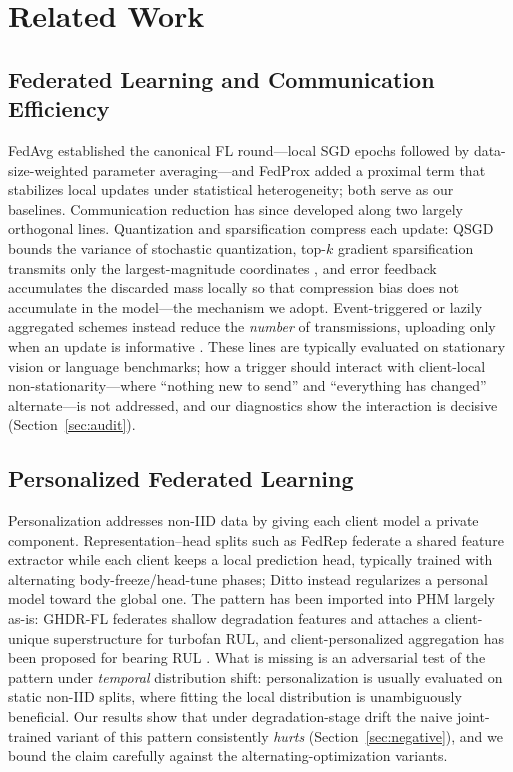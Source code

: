 \documentclass[journal]{IEEEtran}
\begin{document}
\section{Related Work}\label{sec:related}

\subsection{Federated Learning and Communication Efficiency}
FedAvg \cite{mcmahan2017} established the canonical FL round---local SGD epochs followed by data-size-weighted parameter averaging---and FedProx \cite{li2020fedprox} added a proximal term that stabilizes local updates under statistical heterogeneity; both serve as our baselines. Communication reduction has since developed along two largely orthogonal lines. Quantization and sparsification compress each update: QSGD \cite{alistarh2017} bounds the variance of stochastic quantization, top-$k$ gradient sparsification transmits only the largest-magnitude coordinates \cite{aji2017}, and error feedback \cite{karimireddy2019} accumulates the discarded mass locally so that compression bias does not accumulate in the model---the mechanism we adopt. Event-triggered or lazily aggregated schemes instead reduce the \emph{number} of transmissions, uploading only when an update is informative \cite{chen2018lag}. These lines are typically evaluated on stationary vision or language benchmarks; how a trigger should interact with client-local non-stationarity---where ``nothing new to send'' and ``everything has changed'' alternate---is not addressed, and our diagnostics show the interaction is decisive (Section~\ref{sec:audit}).
\subsection{Personalized Federated Learning}
Personalization addresses non-IID data by giving each client model a private component. Representation--head splits such as FedRep \cite{collins2021fedrep} federate a shared feature extractor while each client keeps a local prediction head, typically trained with alternating body-freeze/head-tune phases; Ditto \cite{li2021ditto} instead regularizes a personal model toward the global one. The pattern has been imported into PHM largely as-is: GHDR-FL \cite{chen2023ghdr} federates shallow degradation features and attaches a client-unique superstructure for turbofan RUL, and client-personalized aggregation has been proposed for bearing RUL \cite{chen2024bearing}. What is missing is an adversarial test of the pattern under \emph{temporal} distribution shift: personalization is usually evaluated on static non-IID splits, where fitting the local distribution is unambiguously beneficial. Our results show that under degradation-stage drift the naive joint-trained variant of this pattern consistently \emph{hurts} (Section~\ref{sec:negative}), and we bound the claim carefully against the alternating-optimization variants.
\end{document}
